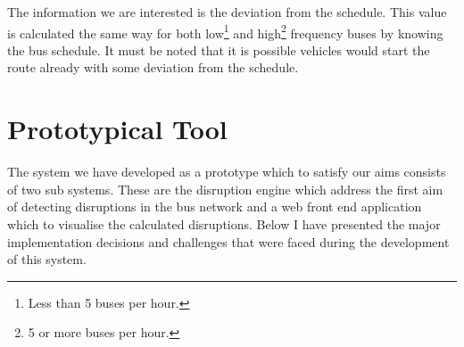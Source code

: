 The information we are interested is the deviation from the schedule. This value is calculated the same way for both low\footnote{Less than 5 buses per hour.} and high\footnote{5 or more buses per hour.} frequency buses by knowing the bus schedule. It must be noted that it is possible vehicles would start the route already with some deviation from the schedule.


\section{Prototypical Tool}
The system we have developed as a prototype which to satisfy our aims consists of two sub systems. These are the disruption engine which address the first aim of detecting disruptions in the bus network and a web front end application which to visualise the calculated disruptions. Below I have presented the major implementation decisions and challenges that were faced during the development of this system.

